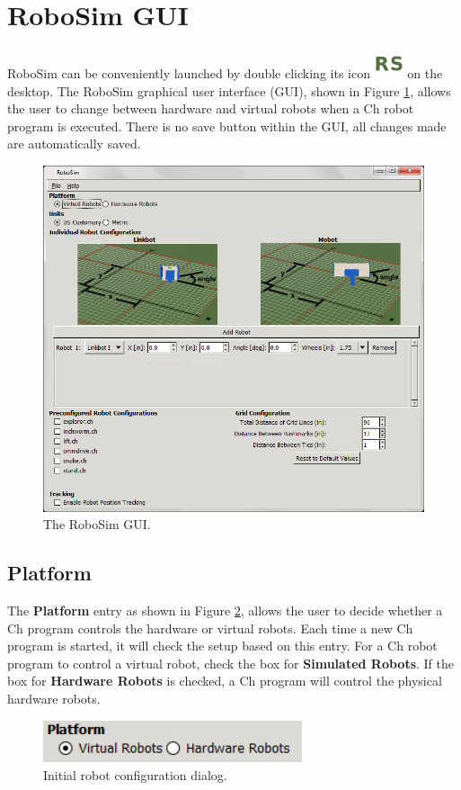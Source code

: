 \documentclass{article}
\begin{document}
\section{RoboSim GUI}
\label{sec:gui}
RoboSim can be conveniently launched by double clicking its icon
\includegraphics[height=24pt]{images/robosim} on the desktop.  The RoboSim
graphical user interface (GUI), shown in Figure \ref{fig:gui}, allows the user
to change between hardware and virtual robots when a Ch robot program is
executed.  There is no save button within the GUI, all changes made are
automatically saved.
\begin{figure}[H]
	\begin{center}
		\includegraphics[width=6in]{images/gui}
	\end{center}
	\caption{The RoboSim GUI.}
	\label{fig:gui}
\end{figure}

\subsection{Platform}
The {\bf Platform} entry as shown in Figure \ref{fig:platform}, allows the user
to decide whether a Ch program controls the hardware or virtual robots.  Each
time a new Ch program is started, it will check the setup based on this entry.
For a Ch robot program to control a virtual robot, check the box for {\bf
Simulated Robots}.  If the box for {\bf Hardware Robots} is checked, a Ch
program will control the physical hardware robots.
\begin{figure}[H]
	\begin{center}
		\includegraphics[width=3in]{images/platform}
	\end{center}
	\caption{Initial robot configuration dialog.}
	\label{fig:platform}
\end{figure}
\end{document}
